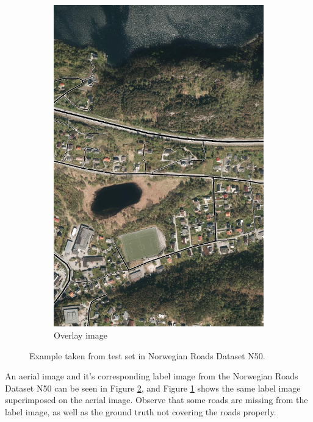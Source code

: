 \begin{figure}
\begin{subfigure}{0.32\textwidth}
\includegraphics[width=\linewidth]{figs/datasets/Norwegian_roads_overlay_example2.png}
\caption{Overlay image} \label{fig:norwegian_roads_example_overlay}
\end{subfigure}
\hspace*{\fill} %
\caption[Example from Norwegian Roads Dataset N50]{Example taken from test set in Norwegian Roads Dataset N50.} \label{fig:norwegian_roads_example}
\end{figure}

An aerial image and it's corresponding label image from the Norwegian Roads Dataset N50 can be seen in Figure \ref{fig:norwegian_roads_example}, and Figure \ref{fig:norwegian_roads_example_overlay} shows the same label image superimposed on the aerial image. Observe that some roads are missing from the label image, as well as the ground truth not covering the roads properly. \\
